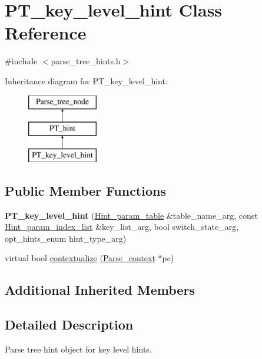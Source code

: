 \hypertarget{classPT__key__level__hint}{}\section{P\+T\+\_\+key\+\_\+level\+\_\+hint Class Reference}
\label{classPT__key__level__hint}


{\ttfamily \#include $<$parse\+\_\+tree\+\_\+hints.\+h$>$}

Inheritance diagram for P\+T\+\_\+key\+\_\+level\+\_\+hint\+:\begin{figure}[H]
\begin{center}
\leavevmode
\includegraphics[height=3.000000cm]{classPT__key__level__hint}
\end{center}
\end{figure}
\subsection*{Public Member Functions}
\begin{DoxyCompactItemize}
\item 
\mbox{\label{classPT__key__level__hint_a656dec3fdcc64aea9b1d0e67bd9a4d84}} 
{\bfseries P\+T\+\_\+key\+\_\+level\+\_\+hint} (\mbox{\hyperlink{structHint__param__table}{Hint\+\_\+param\+\_\+table}} \&table\+\_\+name\+\_\+arg, const \mbox{\hyperlink{classMem__root__array__YY}{Hint\+\_\+param\+\_\+index\+\_\+list}} \&key\+\_\+list\+\_\+arg, bool switch\+\_\+state\+\_\+arg, opt\+\_\+hints\+\_\+enum hint\+\_\+type\+\_\+arg)
\item 
virtual bool \mbox{\hyperlink{classPT__key__level__hint_a3cd3bb9624cf499e03d6a312db574fcf}{contextualize}} (\mbox{\hyperlink{structParse__context}{Parse\+\_\+context}} $\ast$pc)
\end{DoxyCompactItemize}
\subsection*{Additional Inherited Members}


\subsection{Detailed Description}
Parse tree hint object for key level hints. 

